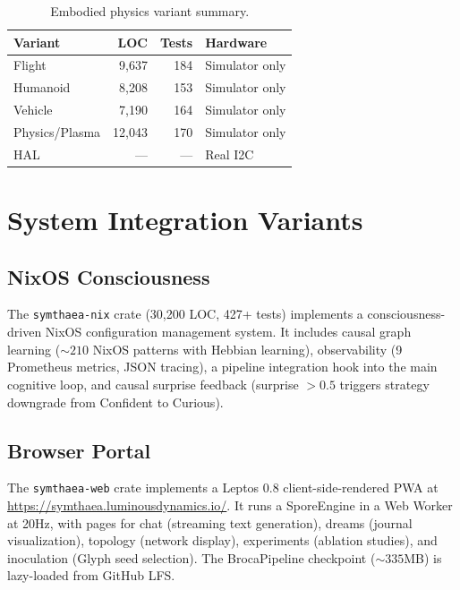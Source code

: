 \documentclass[11pt,twocolumn]{article}
\begin{document}
\begin{table}[H]
\centering
\caption{Embodied physics variant summary.}
\label{tab:embodied-summary}
\begin{tabular}{lrrl}
\toprule
\textbf{Variant} & \textbf{LOC} & \textbf{Tests} & \textbf{Hardware} \\
\midrule
Flight & 9,637 & 184 & Simulator only \\
Humanoid & 8,208 & 153 & Simulator only \\
Vehicle & 7,190 & 164 & Simulator only \\
Physics/Plasma & 12,043 & 170 & Simulator only \\
HAL & --- & --- & Real I2C \\
\bottomrule
\end{tabular}
\end{table}

\section{System Integration Variants}
\label{sec:system}

\subsection{NixOS Consciousness}

The \texttt{symthaea-nix} crate (30,200 LOC, 427+ tests) implements a consciousness-driven NixOS configuration management system. It includes causal graph learning (${\sim}210$ NixOS patterns with Hebbian learning), observability (9 Prometheus metrics, JSON tracing), a pipeline integration hook into the main cognitive loop, and causal surprise feedback (surprise $> 0.5$ triggers strategy downgrade from Confident to Curious).

\subsection{Browser Portal}

The \texttt{symthaea-web} crate implements a Leptos 0.8 client-side-rendered PWA at \url{https://symthaea.luminousdynamics.io/}. It runs a SporeEngine in a Web Worker at 20Hz, with pages for chat (streaming text generation), dreams (journal visualization), topology (network display), experiments (ablation studies), and inoculation (Glyph seed selection). The BrocaPipeline checkpoint (${\sim}335$MB) is lazy-loaded from GitHub LFS.
\end{document}
